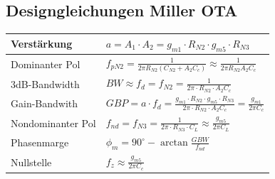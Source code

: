 \subsection{Designgleichungen Miller OTA}
\begin{tabular}{|l|l|} \hline
	Verstärkung & $a = A_1 \cdot A_2 = g_{m1} \cdot R_{N2} \cdot g_{m5} \cdot R_{N3}$ \\ \hline
	Dominanter Pol & $f_{pN2} = \frac{1}{2\pi R_{N2} (C_{N2}+A_2C_c)} \approx \frac{1}{2\pi R_{N2}A_2C_c}$ \\ \hline
	3dB-Bandwidth & $BW \approx f_d = f_{N2} = \frac{1}{2\pi \cdot R_{N2} \cdot A_2C_c}$ \\ \hline
	Gain-Bandwith & $GBP = a \cdot f_d = \frac{g_{m1} \cdot R_{N2} \cdot g_{m5} \cdot R_{N3}}{2\pi \cdot R_{N2} \cdot A_2C_c} = \frac{g_{m1}}{2\pi C_c}$ \\ \hline
	Nondominanter Pol & $f_{nd} = f_{N3} = \frac{1}{2\pi \cdot R_{N3} \cdot C_L} \approx \frac{g_{m5}}{2\pi C_L}$ \\ \hline
	Phasenmarge & $\phi_m = 90^\circ - \arctan \frac{GBW}{f_{nd}}$ \\ \hline
	Nullstelle & $f_z \approx \frac{g_{m5}}{2\pi C_c}$ \\ \hline
\end{tabular}